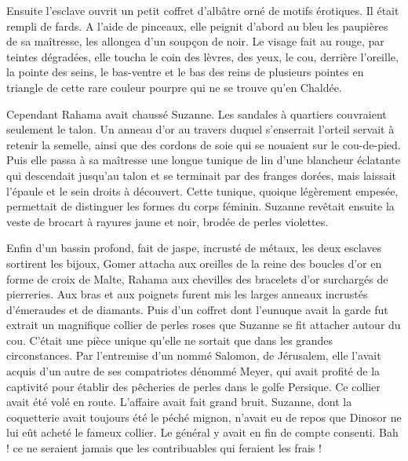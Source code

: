 \documentclass[a4paper, 11pt, oneside, polutonikogreek, french]{article}
\begin{document}
Ensuite l'esclave ouvrit un petit coffret d'albâtre orné de motifs érotiques. Il était rempli de fards. A l'aide de pinceaux, elle peignit d'abord au bleu les paupières de sa maîtresse, les allongea d'un soupçon de noir. Le visage fait au rouge, par teintes dégradées, elle toucha le coin des lèvres, des yeux, le cou, derrière l'oreille, la pointe des seins, le bas-ventre et le bas des reins de plusieurs pointes en triangle de cette rare couleur pourpre qui ne se trouve qu'en Chaldée.

Cependant Rahama avait chaussé Suzanne. Les sandales à quartiers couvraient seulement le talon. Un anneau d'or au travers duquel s'enserrait l'orteil servait à retenir la semelle, ainsi que des cordons de soie qui se nouaient sur le cou-de-pied. Puis elle passa à sa maîtresse une longue tunique de lin d'une blancheur éclatante qui descendait jusqu'au talon et se terminait par des franges dorées, mais laissait l'épaule et le sein droits à découvert. Cette tunique, quoique légèrement empesée, permettait de distinguer les formes du corps féminin. Suzanne revêtait ensuite la veste de brocart à rayures jaune et noir, brodée de perles violettes.

\bigskip
\centerline{\EightStarTaper}
\centerline{\EightStarTaper\EightStarTaper}
\bigskip

Enfin d'un bassin profond, fait de jaspe, incrusté de métaux, les deux esclaves sortirent les bijoux, Gomer attacha aux oreilles de la reine des boucles d'or en forme de croix de Malte, Rahama aux chevilles des bracelets d'or surchargés de pierreries. Aux bras et aux poignets furent mis les larges anneaux incrustés d'émeraudes et de diamants. Puis d'un coffret dont l'eunuque avait la garde fut extrait un magnifique collier de perles roses que Suzanne se fit attacher autour du cou. C'était une pièce unique qu'elle ne sortait que dans les grandes circonstances. Par l'entremise d'un nommé Salomon, de Jérusalem, elle l'avait acquis d'un autre de ses compatriotes dénommé Meyer, qui avait profité de la captivité pour établir des pêcheries de perles dans le golfe Persique. Ce collier avait été volé en route. L'affaire avait fait grand bruit. Suzanne, dont la coquetterie avait toujours été le péché mignon, n'avait eu de repos que Dinosor ne lui eût acheté le fameux collier. Le général y avait en fin de compte consenti. Bah ! ce ne seraient jamais que les contribuables qui feraient les frais !

\bigskip
\centerline{\EightStarTaper}
\centerline{\EightStarTaper\EightStarTaper}
\bigskip
\end{document}
